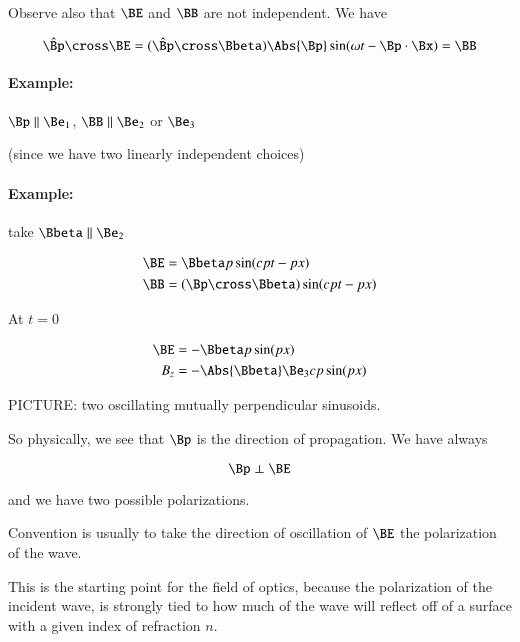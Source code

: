 Observe also that $\BE$ and $\BB$ are not independent.  We have

\begin{equation}\label{eqn:relativisticElectrodynamicsL16:271}
\hat{\Bp} \cross \BE = (\hat{\Bp} \cross \Bbeta) \Abs{\Bp} \sin(\omega t - \Bp \cdot \Bx) = \BB
\end{equation}

\paragraph{Example:} $\Bp \parallel \Be_1$, $\BB \parallel \Be_2$ or $\Be_3$

(since we have two linearly independent choices)

\paragraph{Example:} take $\Bbeta \parallel \Be_2$

\begin{align}\label{eqn:relativisticElectrodynamicsL16:290}
\BE &= \Bbeta p \sin(c p t - p x)  \\
\BB &= (\Bp \cross \Bbeta) \sin(c p t - p x)
\end{align}

At $t = 0$

\begin{align}\label{eqn:relativisticElectrodynamicsL16:310}
\BE &= -\Bbeta p \sin( p x)  \\
B_z &= - \Abs{\Bbeta} \Be_3 c p \sin(p x)
\end{align}

PICTURE: two oscillating mutually perpendicular sinusoids.

So physically, we see that $\Bp$ is the direction of propagation.  We have always

\begin{equation}\label{eqn:relativisticElectrodynamicsL16:330}
\Bp \perp \BE
\end{equation}

and we have two possible polarizations.

Convention is usually to take the direction of oscillation of $\BE$ the polarization of the wave.

This is the starting point for the field of optics, because the polarization of the incident wave, is strongly tied to how much of the wave will reflect off of a surface with a given index of refraction $n$.

